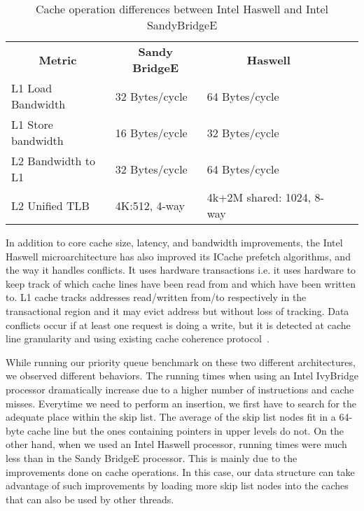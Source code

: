 \begin{table}[ht]
\footnotesize
\begin{tabular}{|l|l|l|ll}
\cline{1-3}
\multicolumn{1}{|c|}{\textbf{Metric}} & \multicolumn{1}{c|}{\textbf{Sandy BridgeE}} & \multicolumn{1}{c|}{\textbf{Haswell}} &  &  \\ \cline{1-3}
L1 Load Bandwidth                     & 32 Bytes/cycle                           & 64 Bytes/cycle                        &  &  \\ \cline{1-3}
L1 Store bandwidth                    & 16 Bytes/cycle                           & 32 Bytes/cycle                        &  &  \\ \cline{1-3}
L2 Bandwidth to L1                    & 32 Bytes/cycle                           & 64 Bytes/cycle                        &  &  \\ \cline{1-3}
L2 Unified TLB                        & 4K:512, 4-way                            & 4k+2M shared: 1024, 8-way             &  &  \\ \cline{1-3}
\end{tabular}
\caption{Cache operation differences between Intel Haswell and Intel SandyBridgeE}
\label{tab:haswell_ivy}
\end{table}

In addition to core cache size, latency, and bandwidth improvements, the Intel Haswell microarchitecture has also improved its ICache prefetch algorithms, and the way it handles conflicts. It uses hardware transactions i.e. it uses hardware to keep track of which cache lines have been read from and which have been written to. L1 cache tracks addresses read/written from/to respectively in the transactional region and it may evict address but without loss of tracking. Data conflicts occur if at least one request is doing a write, but it is detected at cache line granularity and using existing cache coherence protocol~\cite{rajwar_qconsf2012,dk_haswell}.

While running our priority queue benchmark on these two different architectures, we observed different behaviors. The running times when using an Intel IvyBridge processor dramatically increase due to a higher number of instructions and cache misses. Everytime we need to perform an insertion, we first have to search for the adequate place within the skip list. The average of the skip list nodes fit in a 64-byte cache line but the ones containing pointers in upper levels do not. On the other hand, when we used an Intel Haswell processor, running times were much less than in the Sandy BridgeE processor. This is mainly due to the improvements done on cache operations. In this case, our data structure can take advantage of such improvements by loading more skip list nodes into the caches that can also be used by other threads.

